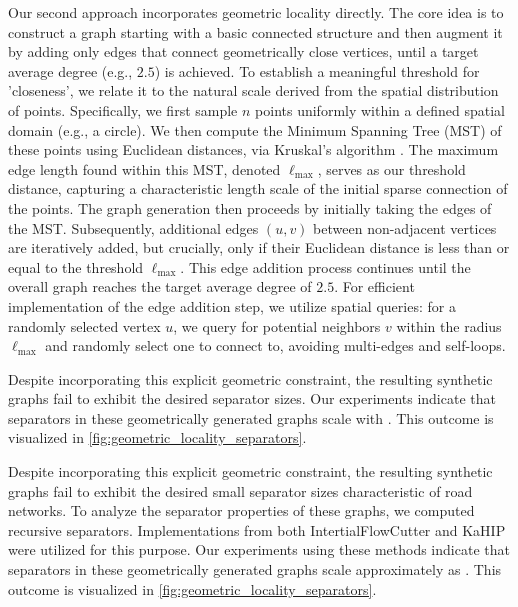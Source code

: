 Our second approach incorporates geometric locality directly.
The core idea is to construct a graph starting with a basic connected structure and then augment it by adding only edges that connect geometrically close vertices, until a target average degree (e.g., \(2.5\)) is achieved.
To establish a meaningful threshold for 'closeness', we relate it to the natural scale derived from the spatial distribution of points.
Specifically, we first sample \(n\) points uniformly within a defined spatial domain (e.g., a circle).
We then compute the Minimum Spanning Tree (MST) of these points using Euclidean distances, via Kruskal's algorithm \cite{kruskal_shortest_1956}.
The maximum edge length found within this MST, denoted \(\ell_{\max}\), serves as our threshold distance, capturing a characteristic length scale of the initial sparse connection of the points.
The graph generation then proceeds by initially taking the edges of the MST.
Subsequently, additional edges \((u, v)\) between non-adjacent vertices are iteratively added, but crucially, only if their Euclidean distance is less than or equal to the threshold \(\ell_{\max}\).
This edge addition process continues until the overall graph reaches the target average degree of \(2.5\).
For efficient implementation of the edge addition step, we utilize spatial queries: for a randomly selected vertex \(u\), we query for potential neighbors \(v\) within the radius \(\ell_{\max}\) and randomly select one to connect to, avoiding multi-edges and self-loops.

Despite incorporating this explicit geometric constraint, the resulting synthetic graphs fail to exhibit the desired separator sizes.
Our experiments indicate that separators in these geometrically generated graphs scale with .
This outcome is visualized in \cref{fig:geometric_locality_separators}.

Despite incorporating this explicit geometric constraint, the resulting synthetic graphs fail to exhibit the desired small separator sizes characteristic of road networks.
To analyze the separator properties of these graphs, we computed recursive separators.
Implementations from both IntertialFlowCutter and KaHIP were utilized for this purpose.
Our experiments using these methods indicate that separators in these geometrically generated graphs scale approximately as .
This outcome is visualized in \cref{fig:geometric_locality_separators}.

